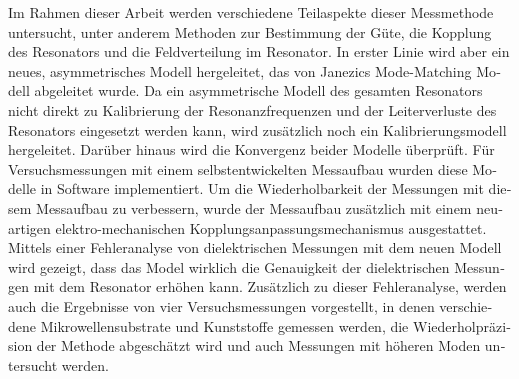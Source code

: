 \begin{otherlanguage}{german}
Im Rahmen dieser Arbeit werden verschiedene Teilaspekte dieser Messmethode untersucht, unter anderem Methoden zur Bestimmung der Güte, die Kopplung des Resonators und die Feldverteilung im Resonator. In erster Linie wird aber ein neues, asymmetrisches Modell hergeleitet, das von Janezics Mode-Matching Modell abgeleitet wurde. Da ein asymmetrische Modell des gesamten Resonators nicht direkt zu Kalibrierung der Resonanzfrequenzen und der Leiterverluste des Resonators eingesetzt werden kann, wird zusätzlich noch ein Kalibrierungs\-modell hergeleitet. Darüber hinaus wird die Konvergenz beider Modelle überprüft. Für Versuchsmessungen mit einem selbstentwickelten Messaufbau wurden diese Modelle in Software implementiert. Um die Wiederholbarkeit der Messungen mit diesem Messaufbau zu verbessern, wurde der Messaufbau zusätzlich mit einem neuartigen elektro-mechanischen Kopp\-lungs\-anpass\-ungs\-mech\-an\-is\-mus ausgestattet. Mittels einer Fehleranalyse von dielektrischen Messungen mit dem neuen Modell wird gezeigt, dass das Model wirklich die Genauigkeit der dielektrischen Messungen mit dem Resonator erhöhen kann. Zusätzlich zu dieser Fehleranalyse, werden auch die Ergebnisse von vier Versuchsmessungen vorgestellt, in denen verschiedene Mikrowellen\-substrate und Kunststoffe gemessen werden, die Wiederholpräzision der Methode abgeschätzt wird und auch Messungen mit höheren Moden untersucht werden.
\end{otherlanguage}
\pagebreak
\restoregeometry

